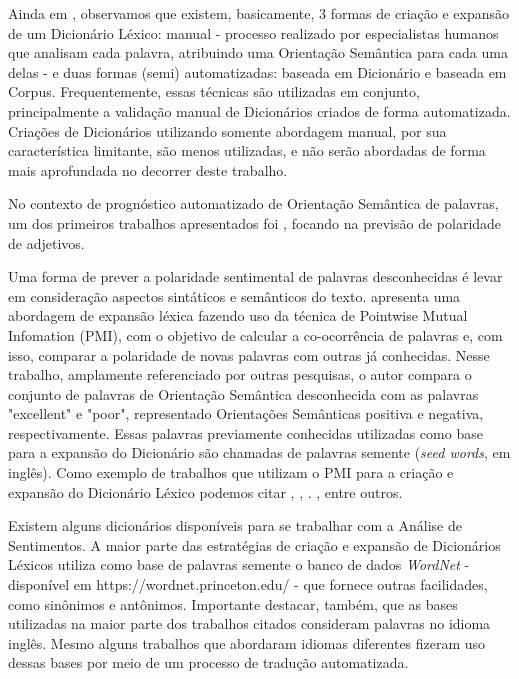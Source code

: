 \documentclass[a4paper,11pt]{article}
\begin{document}
Ainda em \cite{kdir16}, observamos que existem, basicamente, 3 formas de criação e expansão de um Dicionário Léxico: manual -  processo realizado por especialistas humanos que analisam cada palavra, atribuindo uma Orientação Semântica para cada uma delas -  e duas formas (semi) automatizadas: baseada em Dicionário e baseada em Corpus. Frequentemente, essas técnicas são utilizadas em conjunto, principalmente a validação manual de Dicionários criados de forma automatizada. Criações de Dicionários utilizando somente abordagem manual, por sua característica limitante, são menos utilizadas, e não serão abordadas de forma mais aprofundada no decorrer deste trabalho.

No contexto de prognóstico automatizado de Orientação Semântica de palavras, um dos primeiros trabalhos apresentados foi \cite{Hatzivassiloglou}, focando na previsão de polaridade de adjetivos.

Uma forma de prever a polaridade sentimental de palavras desconhecidas é levar em consideração aspectos sintáticos e semânticos do texto. \cite{Turney2002} apresenta uma abordagem de expansão léxica fazendo uso da técnica de Pointwise Mutual Infomation (PMI), com o objetivo de calcular a co-ocorrência de palavras e, com isso, comparar a polaridade de novas palavras com outras já conhecidas. Nesse trabalho, amplamente referenciado por outras pesquisas, o autor compara o conjunto de palavras de Orientação Semântica desconhecida com as palavras "excellent" e "poor", representado Orientações Semânticas positiva e negativa, respectivamente. Essas palavras previamente conhecidas utilizadas como base para a expansão do Dicionário são chamadas de palavras semente (\emph{seed words}, em inglês). Como exemplo de trabalhos que utilizam o PMI para a criação e expansão do Dicionário Léxico podemos citar \cite{becker2013}, \cite{Zhou2014}, \cite{Pinto2007}. \cite{Pantel2006}, entre outros.

Existem alguns dicionários disponíveis para se trabalhar com a Análise de Sentimentos. A maior parte das estratégias de criação e expansão de Dicionários Léxicos utiliza como base de palavras semente o banco de dados \emph{WordNet} - disponível em https://wordnet.princeton.edu/ - que fornece outras facilidades, como sinônimos e antônimos. Importante destacar, também, que as bases utilizadas na maior parte dos trabalhos citados consideram palavras no idioma inglês. Mesmo alguns trabalhos que abordaram idiomas diferentes fizeram uso dessas bases por meio de um processo de tradução automatizada.
\end{document}
